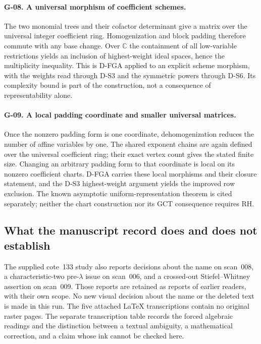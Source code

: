 \paragraph{G-08. A universal morphism of coefficient schemes.}
The two monomial trees and their cofactor determinant give a matrix over the universal integer coefficient ring. Homogenization and block padding therefore commute with any base change. Over $\mathbb C$ the containment of all low-variable restrictions yields an inclusion of highest-weight ideal spaces, hence the multiplicity inequality. This is D-FGA applied to an explicit scheme morphism, with the weights read through D-S3 and the symmetric powers through D-S6. Its complexity bound is part of the construction, not a consequence of representability alone.

\paragraph{G-09. A local padding coordinate and smaller universal matrices.}
Once the nonzero padding form is one coordinate, dehomogenization reduces the number of affine variables by one. The shared exponent chains are again defined over the universal coefficient ring; their exact vertex count gives the stated finite size. Changing an arbitrary padding form to that coordinate is local on its nonzero coefficient charts. D-FGA carries these local morphisms and their closure statement, and the D-S3 highest-weight argument yields the improved row exclusion. The known asymptotic uniform-representation theorem is cited separately; neither the chart construction nor its GCT consequence requires RH.

\subsection{What the manuscript record does and does not establish}
The supplied cote~133 study also reports decisions about the name on scan~008, a characteristic-two pre-$\lambda$ issue on scan~006, and a crossed-out Stiefel--Whitney assertion on scan~009. Those reports are retained as reports of earlier readers, with their own scope. No new visual decision about the name or the deleted text is made in this run. The five attached LaTeX transcriptions contain no original raster pages. The separate transcription table records the forced algebraic readings and the distinction between a textual ambiguity, a mathematical correction, and a claim whose ink cannot be checked here.

